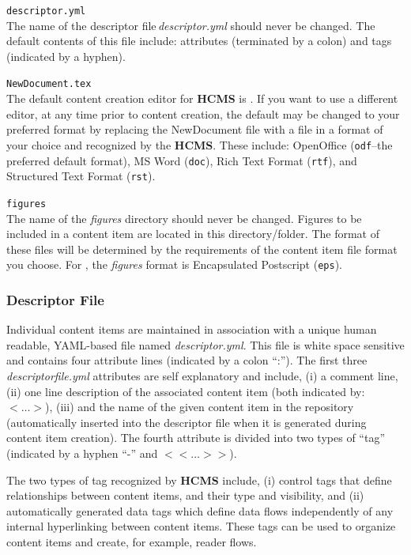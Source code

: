 \documentclass[12pt]{article}
\begin{document}
\begin{description} 
	\item {\tt descriptor.yml}\\
	The name of the descriptor file\,{\it descriptor.yml} should never be changed. The default contents of this file include: attributes (terminated by a colon) and tags (indicated by a hyphen).
	\item {\tt NewDocument.tex}\\
	The default content creation editor for {\bf \small HCMS} is \LaTeXe. If you want to use a different editor, at any time prior to content creation, the default may be changed to your preferred format by replacing the NewDocument file with a file in a format of your choice and recognized by the {\bf \small HCMS}. These include: OpenOffice ({\tt odf}--the preferred default format), MS Word ({\tt doc}), Rich Text Format ({\tt rtf}), and Structured Text Format ({\tt rst}).
	\item {\tt figures}\\
	The name of the {\it figures} directory should never be changed. Figures to be included in a content item are located in this directory/folder. The format of these files will be determined by the requirements of the content item file format you choose. For \LaTeXe, the {\it figures} format is Encapsulated Postscript ({\tt eps}).
\end{description}

\subsubsection{Descriptor File}

Individual content items are maintained in association with a unique human readable, YAML-based file named {\it descriptor.yml}. This file is white space sensitive and contains four attribute lines (indicated by a colon ``:''). The first three {\it descriptorfile.yml} attributes are self explanatory and include, (i) a comment line, (ii) one line description of the associated content item (both indicated by: {\small{$<\ldots>$}}), (iii) and the name of the given content item in the repository (automatically inserted into the descriptor file when it is generated during content item creation). The fourth attribute is divided into two types of ``tag'' (indicated by a hyphen ``-''  and {\small{$<<\ldots>>$}}).

The two types of tag recognized by {\bf \small HCMS} include, (i) control tags that define relationships between content items, and their type and visibility, and (ii) automatically generated data tags which define data flows independently of any internal hyperlinking between content items. These tags can be used to organize content items and create, for example, reader flows.
\end{document}
